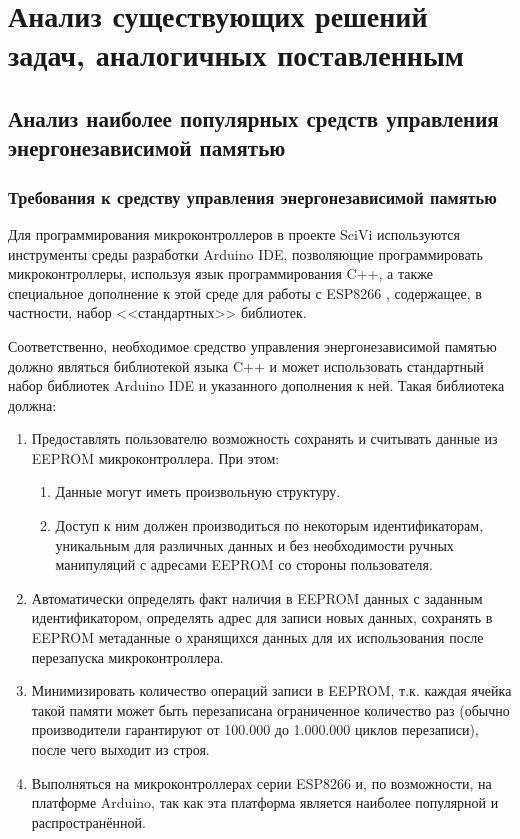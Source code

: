 \chapter{Анализ существующих решений задач, аналогичных поставленным}

\section{Анализ наиболее популярных средств управления энергонезависимой памятью}

\subsection{Требования к средству управления энергонезависимой памятью} \label{subsection:requirements}

Для программирования микроконтроллеров в проекте SciVi используются инструменты среды разработки Arduino IDE, позволяющие программировать микроконтроллеры, используя язык программирования C++, а также специальное дополнение к этой среде для работы с ESP8266 \cite{web:esp-core}, содержащее, в частности, набор <<стандартных>> библиотек.

Соответственно, необходимое средство управления энергонезависимой памятью должно являться библиотекой языка C++ и может использовать стандартный набор библиотек Arduino IDE и указанного дополнения к ней.
Такая библиотека должна:
\begin{enumerate}
	\item Предоставлять пользователю возможность сохранять и считывать данные из EEPROM микроконтроллера. При этом:
	\begin{enumerate}
		\item Данные могут иметь произвольную структуру.
		\item Доступ к ним должен производиться по некоторым  идентификаторам, уникальным для различных данных и без необходимости ручных манипуляций с адресами EEPROM со стороны пользователя.
	\end{enumerate}
	\item Автоматически определять факт наличия в EEPROM данных с заданным идентификатором, определять адрес для записи новых данных, сохранять в EEPROM метаданные о хранящихся данных для их использования после перезапуска микроконтроллера.
	\item Минимизировать количество операций записи в EEPROM, т.к. каждая ячейка такой памяти может быть перезаписана ограниченное количество раз (обычно производители гарантируют от 100.000 до 1.000.000 циклов перезаписи), после чего выходит из строя.
	\item Выполняться на микроконтроллерах серии ESP8266 и, по возможности, на платформе Arduino, так как эта платформа является наиболее популярной и распространённой.
\end{enumerate}

